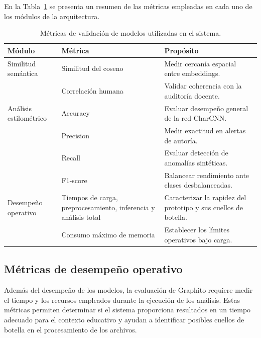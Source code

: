 En la Tabla~\ref{tab:resumen_metricas} se presenta un resumen de las métricas empleadas en cada uno de los módulos de la arquitectura.

\begin{table}[H]
	\centering
	\begin{tabularx}{\textwidth}{llX}
		\toprule
		\textbf{Módulo}        & \textbf{Métrica}     & \textbf{Propósito}                                \\
		\midrule
		Similitud semántica    & Similitud del coseno & Medir cercanía espacial entre embeddings.         \\
		                       & Correlación humana   & Validar coherencia con la auditoría docente.      \\
		\midrule
		Análisis estilométrico & Accuracy             & Evaluar desempeño general de la red CharCNN.      \\
		                       & Precision            & Medir exactitud en alertas de autoría.            \\
		                       & Recall               & Evaluar detección de anomalías sintéticas.        \\
		                       & F1-score             & Balancear rendimiento ante clases desbalanceadas. \\
		\midrule
		Desempeño operativo    & Tiempos de carga, preprocesamiento, inferencia y análisis total & Caracterizar la rapidez del prototipo y sus cuellos de botella. \\
		                       & Consumo máximo de memoria & Establecer los límites operativos bajo carga. \\
		\bottomrule
	\end{tabularx}
	\caption{Métricas de validación de modelos utilizadas en el sistema.}
	\label{tab:resumen_metricas}
\end{table}

\subsection{Métricas de desempeño operativo}

Además del desempeño de los modelos, la evaluación de Graphito requiere medir el tiempo y los recursos empleados durante la ejecución de los análisis. Estas métricas permiten determinar si el sistema proporciona resultados en un tiempo adecuado para el contexto educativo y ayudan a identificar posibles cuellos de botella en el procesamiento de los archivos.

